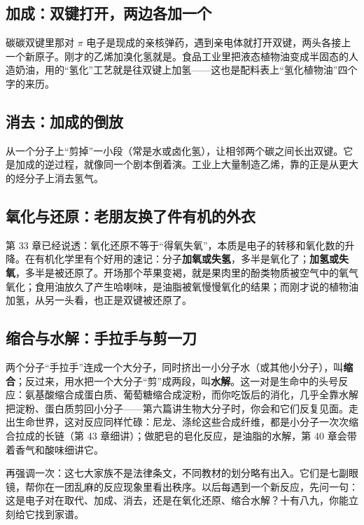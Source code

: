 \subsection{加成：双键打开，两边各加一个}

碳碳双键里那对 $\pi$ 电子是现成的亲核弹药，遇到亲电体就打开双键，两头各接上一个新原子。刚才的乙烯加溴化氢就是。食品工业里把液态植物油变成半固态的人造奶油，用的“氢化”工艺就是往双键上加氢——这也是配料表上“氢化植物油”四个字的来历。

\subsection{消去：加成的倒放}

从一个分子上“剪掉”一小段（常是水或卤化氢），让相邻两个碳之间长出双键。它是加成的逆过程，就像同一个剧本倒着演。工业上大量制造乙烯，靠的正是从更大的烃分子上消去氢气。

\subsection{氧化与还原：老朋友换了件有机的外衣}

第 33 章已经说透：氧化还原不等于“得氧失氧”，本质是电子的转移和氧化数的升降。在有机化学里有个好用的速记：分子\textbf{加氧或失氢}，多半是氧化了；\textbf{加氢或失氧}，多半是被还原了。开场那个苹果变褐，就是果肉里的酚类物质被空气中的氧气氧化；食用油放久了产生哈喇味，是油脂被氧慢慢氧化的结果；而刚才说的植物油加氢，从另一头看，也正是双键被还原了。

\subsection{缩合与水解：手拉手与剪一刀}

两个分子“手拉手”连成一个大分子，同时挤出一小分子水（或其他小分子），叫\textbf{缩合}；反过来，用水把一个大分子“剪”成两段，叫\textbf{水解}。这一对是生命中的头号反应：氨基酸缩合成蛋白质、葡萄糖缩合成淀粉，而你吃饭后的消化，几乎全靠水解把淀粉、蛋白质剪回小分子——第六篇讲生物大分子时，你会和它们反复见面。走出生命世界，这对反应同样忙碌：尼龙、涤纶这些合成纤维，都是小分子一次次缩合拉成的长链（第 43 章细讲）；做肥皂的皂化反应，是油脂的水解，第 40 章会带着香气和酸味细讲它。

再强调一次：这七大家族不是法律条文，不同教材的划分略有出入。它们是七副眼镜，帮你在一团乱麻的反应现象里看出秩序。以后每遇到一个新反应，先问一句：这是电子对在取代、加成、消去，还是在氧化还原、缩合水解？十有八九，你能立刻给它找到家谱。

